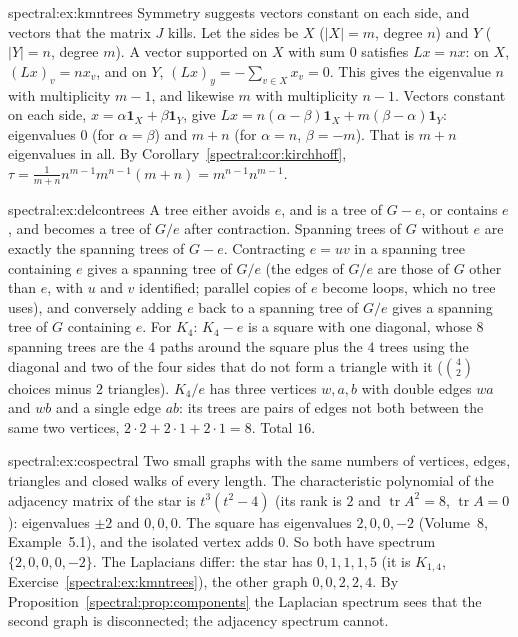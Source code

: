 \begin{solution}{spectral:ex:kmntrees}
\idea Symmetry suggests vectors constant on each side, and vectors that the matrix $J$ kills.
\writeup Let the sides be $X$ ($|X|=m$, degree $n$) and $Y$ ($|Y|=n$, degree $m$). A vector supported on $X$ with sum $0$ satisfies $Lx=nx$: on $X$, $(Lx)_v=nx_v$, and on $Y$, $(Lx)_y=-\sum_{v\in X}x_v=0$. This gives
the eigenvalue $n$ with multiplicity $m-1$, and likewise $m$ with multiplicity $n-1$. Vectors constant on each side, $x=\alpha\mathbf1_X+\beta\mathbf1_Y$, give $Lx=n(\alpha-\beta)\mathbf1_X+m(\beta-\alpha)\mathbf1_Y$: eigenvalues
$0$ (for $\alpha=\beta$) and $m+n$ (for $\alpha=n$, $\beta=-m$). That is $m+n$ eigenvalues in all. By Corollary~\ref{spectral:cor:kirchhoff}, $\tau=\frac1{m+n}n^{m-1}m^{n-1}(m+n)=m^{n-1}n^{m-1}$.
\end{solution}

\begin{solution}{spectral:ex:delcontrees}
\idea A tree either avoids $e$, and is a tree of $G-e$, or contains $e$, and becomes a tree of $G/e$ after contraction.
\writeup Spanning trees of $G$ without $e$ are exactly the spanning trees of $G-e$. Contracting $e=uv$ in a spanning tree containing $e$ gives a spanning tree of $G/e$ (the edges of $G/e$ are those of $G$
other than $e$, with $u$ and $v$ identified; parallel copies of $e$ become loops, which no tree uses), and conversely adding $e$ back to a spanning tree of $G/e$ gives a spanning tree of $G$ containing $e$.
For $K_4$: $K_4-e$ is a square with one diagonal, whose $8$ spanning trees are the $4$ paths around the square plus the $4$ trees using the diagonal and two of the four sides that do not form a
triangle with it ($\binom42$ choices minus $2$ triangles). $K_4/e$ has three vertices $w,a,b$ with double edges $wa$ and $wb$ and a single edge $ab$: its trees are pairs of edges not both between the same
two vertices, $2\cdot2+2\cdot1+2\cdot1=8$. Total $16$.
\end{solution}

\begin{solution}{spectral:ex:cospectral}
\idea Two small graphs with the same numbers of vertices, edges, triangles and closed walks of every length.
\writeup The characteristic polynomial of the adjacency matrix of the star is $t^3(t^2-4)$ (its rank is $2$ and $\operatorname{tr}A^2=8$, $\operatorname{tr}A=0$): eigenvalues $\pm2$ and $0,0,0$. The square has eigenvalues $2,0,0,-2$ (Volume~8, Example~5.1), and the isolated vertex
adds $0$. So both have spectrum $\{2,0,0,0,-2\}$. The Laplacians differ: the star has $0,1,1,1,5$ (it is $K_{1,4}$, Exercise~\ref{spectral:ex:kmntrees}), the other graph $0,0,2,2,4$. By Proposition~\ref{spectral:prop:components} the
Laplacian spectrum sees that the second graph is disconnected; the adjacency spectrum cannot.
\end{solution}

